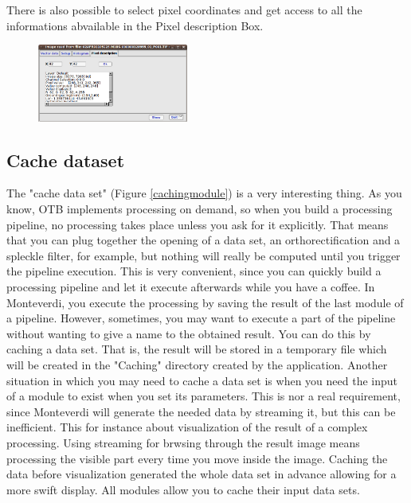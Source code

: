There is also possible to select pixel coordinates and get access to all the informations abvailable in the Pixel description 
Box.

\begin{figure}
   \center
   \includegraphics[width=0.44\textwidth]{../Art/MonteverdiImages/monteverdi_viewer_pixel_description.png}
   \label{fig:pixeldescriptioninformations}
\end{figure}

\subsection{Cache dataset}
The "cache data set" (Figure \ref{cachingmodule}) is a very interesting thing. As you know, OTB implements processing on demand, so when you build a 
processing pipeline, no processing takes place unless you ask for it explicitly. That means that you can plug together
 the opening of a data set, an orthorectification and a spleckle filter, for example, but nothing will really be computed 
until you trigger the pipeline execution. This is very convenient, since you can quickly build a processing pipeline and 
let it execute afterwards while you have a coffee. In Monteverdi, you execute the processing by saving the result of the 
last module of a pipeline. However, sometimes, you may want to execute a part of the pipeline without wanting to give a 
name to the obtained result. You can do this by caching a data set. That is, the result will be stored in a temporary 
file which will be created in the "Caching" directory created by the application. Another situation in which you may need 
to cache a data set is when you need the input of a module to exist when you set its parameters. This is nor a real requirement, 
since Monteverdi will generate the needed data by streaming it, but this can be inefficient. This for instance about visualization
 of the result of a complex processing. Using streaming for brwsing through the result image means processing the visible part 
every time you move inside the image. Caching the data before visualization generated the whole data set in advance allowing 
for a more swift display. All modules allow you to cache their input data sets.

